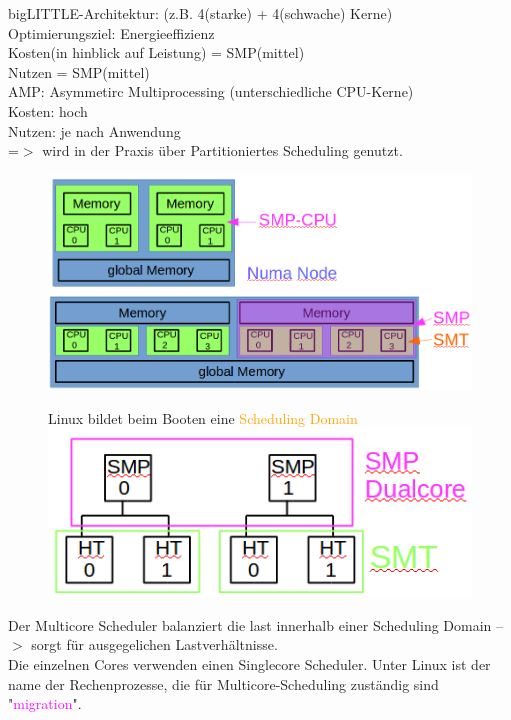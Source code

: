 \documentclass[12pt,a4paper,oneside,ngerman]{article}
\begin{document}
bigLITTLE-Architektur: (z.B. 4(starke) + 4(schwache) Kerne) \\
Optimierungsziel: Energieeffizienz\\
Kosten(in hinblick auf Leistung) = SMP(mittel)\\
Nutzen = SMP(mittel)\\

AMP: Asymmetirc Multiprocessing (unterschiedliche CPU-Kerne)\\
Kosten: hoch\\
Nutzen: je nach Anwendung\\
=$>$ wird in der Praxis über Partitioniertes Scheduling genutzt.

\begin{figure}[H]
	\centering
	\includegraphics[scale=0.4]{umlet/numa_node.png}
\end{figure}

\begin{figure}[H]
	Linux bildet beim Booten eine \textcolor{orange}{Scheduling Domain}
	\centering
	\includegraphics[scale=0.6]{umlet/scheduling_domain.png}
\end{figure}

Der Multicore Scheduler balanziert die last innerhalb einer Scheduling Domain --$>$ sorgt für ausgegelichen Lastverhältnisse.\\
Die einzelnen Cores verwenden einen Singlecore Scheduler.
Unter Linux ist der name der Rechenprozesse, die für Multicore-Scheduling zuständig sind "\textcolor{magenta}{migration}".\\
\end{document}
